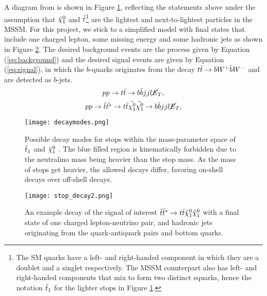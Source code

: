 A diagram from \cite{aad2014search} is shown in Figure \ref{fig:decayMode}, reflecting the statements above under the assumption that $ \Tilde{\chi}_1^0 $ and $\Tilde{t}$\footnote{The SM quarks have a left- and right-handed component in which they are a doublet and a singlet respectively. The MSSM counterpart also has left- and right-handed components that mix to form two distinct squarks, hence the notation $\Tilde{t}_1$ for the lighter stops in Figure \ref{fig:decayMode}.} are the lightest and next-to-lightest particles in the MSSM. For this project, we stick to a simplified model with final states that include one charged lepton, some missing energy and some hadronic jets as shown in Figure \ref{fig:stopDecay}. The
desired background events are the process given by Equation (\ref{eq:background}) and the desired signal events are given by Equation (\ref{eq:signal}), in which the $b$-quarks originates from the decay $t\Bar{t} \rightarrow bW^+ \Bar{b}W^-$ and are detected as $b$-jets. \\

\begin{equation}
 pp \rightarrow t \Bar{t} \rightarrow b\Bar{b}jjl\cancel{\it{E}}_{T},
 \label{eq:background}
\end{equation}
\begin{equation}
  pp \rightarrow \Tilde{t}\Tilde{t^*} \rightarrow t \Bar{t} \Tilde{\chi^0_1}\Tilde{\chi^0_1} \rightarrow b\Bar{b}jjl\cancel{\it{E}}_{T},
  \label{eq:signal}
\end{equation}

\begin{figure}[htbp]
    \centering
    \texttt{[image: decaymodes.png]}
    \caption{Possible decay modes for stops within the mass-parameter space of $\Tilde{t}_1 $ and $ \Tilde{\chi}_1^0 $ \cite{aad2014search}. The blue filled region is kinematically forbidden due to the neutralino mass being heavier than the stop mass. As the mass of stops get heavier, the allowed decays differ, favoring on-shell decays over off-shell decays.}
    \label{fig:decayMode}
\end{figure}


\begin{figure}[htbp]
    \centering
    \texttt{[image: stop\_decay2.png]}
    \caption{An example decay of the signal of interest $\Tilde{t}\Tilde{t}^* \rightarrow t\bar{t}\Tilde{\chi}_1^0\Tilde{\chi}_1^0 $ with a final state of one charged lepton-neutrino pair, and hadronic jets originating from the quark-antiquark pairs and bottom quarks.}
    \label{fig:stopDecay}
\end{figure}


